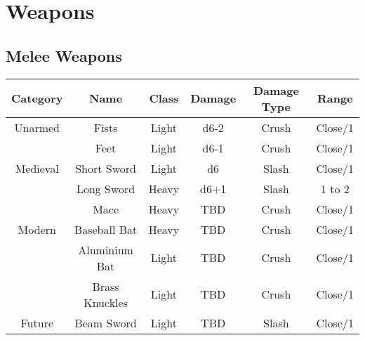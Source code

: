 
\section{Weapons} \label{sec:weapons}
\subsection{Melee Weapons}
\begin{center}
\begin{tabular}{c | c | c | c | c | c}
    \textbf{Category} & \textbf{Name} & \textbf{Class} & \textbf{Damage} & \textbf{Damage Type} & \textbf{Range} \\\hline
    Unarmed  & Fists          & Light & d6-2  & Crush & Close/1\\
             & Feet           & Light & d6-1  & Crush & Close/1 \\\hline
    Medieval & Short Sword    & Light & d6    & Slash & Close/1 \\
             & Long Sword     & Heavy & d6+1  & Slash & 1 to 2 \\
             & Mace           & Heavy &  TBD  & Crush & Close/1\\\hline
    Modern   & Baseball Bat   & Heavy &  TBD  & Crush & Close/1\\
             & Aluminium Bat  & Light &  TBD  & Crush & Close/1\\
             & Brass Knuckles & Light &  TBD  & Crush & Close/1\\\hline
    Future   & Beam Sword     & Light &  TBD  & Slash & Close/1
\end{tabular}
\end{center}

